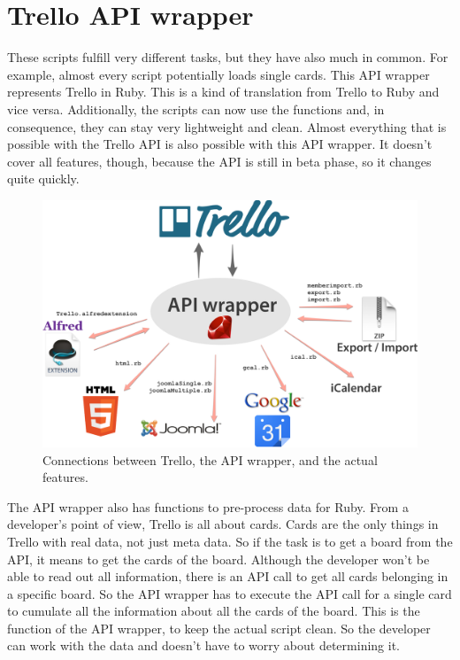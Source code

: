 \onehalfspacing
\chapter{Trello API wrapper}\label{apiwrapper}

These scripts fulfill very different tasks, but they have also much in common. For example, almost every script potentially loads single cards. This API wrapper represents Trello in Ruby. This is a kind of translation from Trello to Ruby and vice versa. Additionally, the scripts can now use the functions and, in consequence, they can stay very lightweight and clean. Almost everything that is possible with the Trello API is also possible with this API wrapper. It doesn't cover all features, though, because the API is still in beta phase, so it changes quite quickly.

\begin{figure}
\centering
\includegraphics[width=\textwidth]{figures/api-wrapper}
\caption{Connections between Trello, the API wrapper, and the actual features. \cite{ruby:icon}\cite{html:logo}\cite{joomla}\cite{google} }
\label{fig: api-wrapper}
\end{figure}

The API wrapper also has functions to pre-process data for Ruby. From a developer's point of view, Trello is all about cards. Cards are the only things in Trello with real data, not just meta data. So if the task is to get a board from the API, it means to get the cards of the board. Although the developer won't be able to read out all information, there is an API call to get all cards belonging in a specific board. So the API wrapper has to execute the API call for a single card to cumulate all the information about all the cards of the board. This is the function of the API wrapper, to keep the actual script clean. So the developer can work with the data and doesn't have to worry about determining it.

